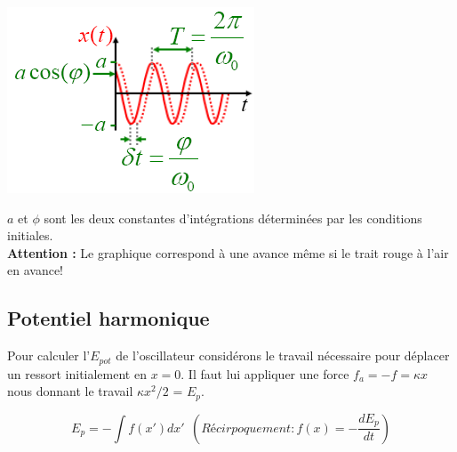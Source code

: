 \documentclass	[11pt, a4paper, openany]{book}
\begin{document}
\begin{center}
\includegraphics[scale=0.55]{oo/image2.png}
\end{center}
$a$ et $\phi$ sont les deux constantes d'intégrations déterminées par les conditions initiales.\\
\textbf{Attention :} Le graphique correspond à une avance même si le trait rouge à l'air en avance!

\subsection{Potentiel harmonique}
Pour calculer l'$E_{pot}$ de l'oscillateur considérons le travail nécessaire pour déplacer un ressort initialement en $x = 0$. Il faut lui appliquer une force $f_a = -f = \kappa x$ nous donnant le travail $\kappa x^2/2$ = $E_p$. 

\begin{equation}
E_p = - \int f(x') dx'\ \ \left(Récirpoquement : f(x) = -\frac{dE_p}{dt}\right)
\end{equation}
\end{document}
